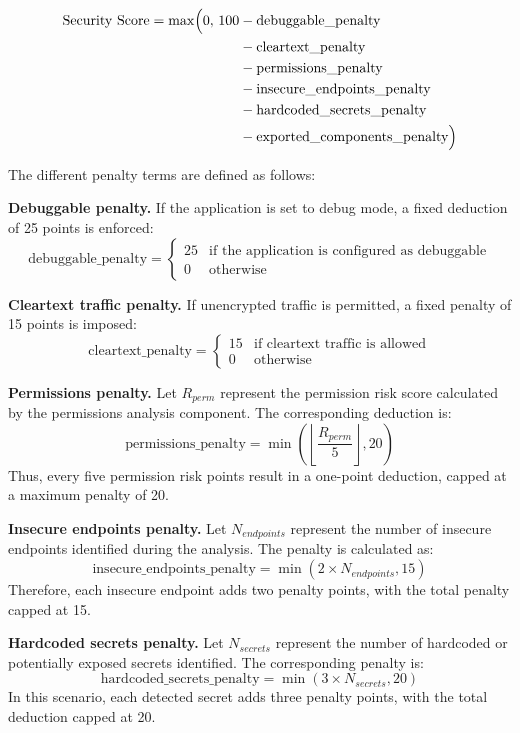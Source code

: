\documentclass[preprint,12pt, a4paper]{elsarticle}
\begin{document}
\begin{equation}
\begin{aligned}
\mathrm{Security\ Score} = \max \Bigl(
0,\,
100
&- \mathrm{debuggable\_penalty} \\
&- \mathrm{cleartext\_penalty} \\
&- \mathrm{permissions\_penalty} \\
&- \mathrm{insecure\_endpoints\_penalty} \\
&- \mathrm{hardcoded\_secrets\_penalty} \\
&- \mathrm{exported\_components\_penalty}
\Bigr)
\end{aligned}
\end{equation}

The different penalty terms are defined as follows:

\textbf{Debuggable penalty.} If the application is set to debug mode, a fixed deduction of 25 points is enforced:
    \[
    \mathrm{debuggable\_penalty}=
    \begin{cases}
    25 & \text{if the application is configured as debuggable} \\
    0 & \text{otherwise}
    \end{cases}
    \]

\textbf{Cleartext traffic penalty.} If unencrypted traffic is permitted, a fixed penalty of 15 points is imposed:
    \[
    \mathrm{cleartext\_penalty}=
    \begin{cases}
    15 & \text{if cleartext traffic is allowed} \\
    0 & \text{otherwise}
    \end{cases}
    \]

\textbf{Permissions penalty.} Let $R_{perm}$ represent the permission risk score calculated by the permissions analysis component. The corresponding deduction is:
    \[
    \mathrm{permissions\_penalty} = \min\left(\left\lfloor \frac{R_{perm}}{5} \right\rfloor, 20\right)
    \]
    Thus, every five permission risk points result in a one-point deduction, capped at a maximum penalty of 20.

\textbf{Insecure endpoints penalty.} Let $N_{endpoints}$ represent the number of insecure endpoints identified during the analysis. The penalty is calculated as:
    \[
    \mathrm{insecure\_endpoints\_penalty} = \min\left(2 \times N_{endpoints}, 15\right)
    \]
    Therefore, each insecure endpoint adds two penalty points, with the total penalty capped at 15.

\textbf{Hardcoded secrets penalty.} Let $N_{secrets}$ represent the number of hardcoded or potentially exposed secrets identified. The corresponding penalty is:
    \[
    \mathrm{hardcoded\_secrets\_penalty} = \min\left(3 \times N_{secrets}, 20\right)
    \]
    In this scenario, each detected secret adds three penalty points, with the total deduction capped at 20.
\end{document}
